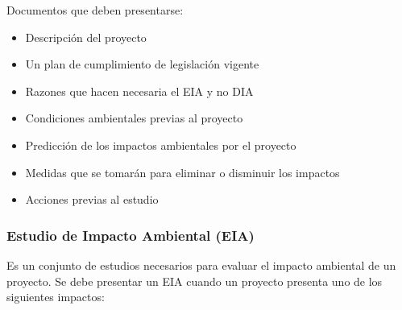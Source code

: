 \documentclass{article} %
\begin{document}
Documentos que deben presentarse:

\begin{itemize}[label={},left=0pt,align=parleft]
    \item \begin{highlightbox}[levelone] Descripción del proyecto \end{highlightbox}
    \item \begin{highlightbox}[levelone] Un plan de cumplimiento de legislación vigente \end{highlightbox}
    \item \begin{highlightbox}[levelone] Razones que hacen necesaria el EIA y no DIA \end{highlightbox}
    \item \begin{highlightbox}[levelone] Condiciones ambientales previas al proyecto \end{highlightbox}
    \item \begin{highlightbox}[levelone] Predicción de los impactos ambientales por el proyecto \end{highlightbox}
    \item \begin{highlightbox}[levelone] Medidas que se tomarán para eliminar o disminuir los impactos \end{highlightbox}
    \item \begin{highlightbox}[levelone] Acciones previas al estudio \end{highlightbox}
\end{itemize}

\subsubsection{Estudio de Impacto Ambiental (EIA)}

Es un conjunto de estudios necesarios para evaluar el impacto ambiental de un proyecto. Se debe presentar un EIA cuando un proyecto presenta uno de los siguientes impactos:
\end{document}
